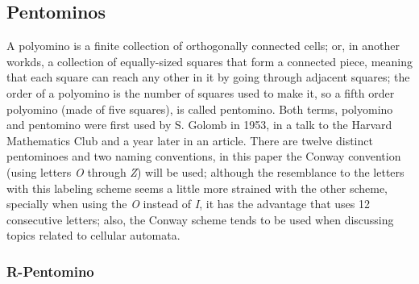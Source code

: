 
\subsection{Pentominos}

A polyomino is a finite collection of orthogonally connected cells; or, in
another workds, a collection of equally-sized squares that form a connected
piece, meaning that each square can reach any other in it by going through
adjacent squares; the order of a polyomino is the number of squares used to
make it, so a fifth order polyomino (made of five squares), is called
pentomino. Both terms, polyomino and pentomino were first used by S. Golomb in
1953, in a talk to the Harvard Mathematics Club and a year later in an article.
There are twelve distinct pentominoes and two naming conventions, in this paper
the Conway convention (using letters \textit{O} through \textit{Z}) will be
used; although the resemblance to the letters with this labeling scheme seems
a little more strained with the other scheme, specially when using the
\textit{O} instead of \textit{I}, it has the advantage that uses 12
consecutive letters; also, the Conway scheme tends to be used when discussing
topics related to cellular automata.


\subsubsection{R-Pentomino}
